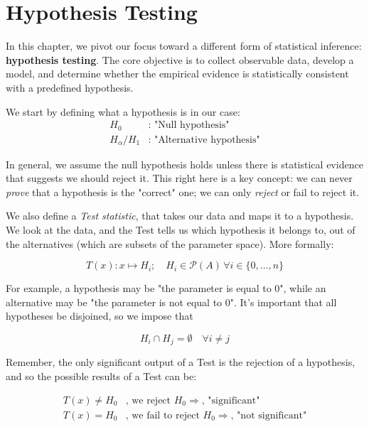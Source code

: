 \chapter{Hypothesis Testing}
In this chapter, we pivot our focus toward a different form of statistical inference: \textbf{hypothesis testing}. The core objective is to collect observable data, develop a model, and determine whether the empirical evidence is statistically consistent with a predefined hypothesis.

We start by defining what a hypothesis is in our case:
	\begin{align*}
	H_0&:\text{ "Null hypothesis"}\\
	H_\alpha/H_1&:\text{ "Alternative hypothesis"}	
	\end{align*}

In general, we assume the null hypothesis holds unless there is statistical evidence that suggests we should reject it. This right here is a key concept: we can never \emph{prove} that a hypothesis is the "correct" one; we can only \emph{reject} or fail to reject it.



We also define a \emph{Test statistic}, that takes our data and maps it to a hypothesis. We look at the data, and the Test tells us which hypothesis it belongs to, out of the alternatives (which are subsets of the parameter space). More formally:

	\[
	T(x) : x\mapsto H_i; \quad H_i\in \mathcal{P}(A)\,\forall i \in \{0,\dots,n\}
	\]

For example, a hypothesis may be "the parameter is equal to $0$", while an alternative may be "the parameter is not equal to $0$". It's important that all hypotheses be disjoined, so we impose that

	\[
	H_i\cap H_j = \emptyset \quad \forall i\neq j
	\]

Remember, the only significant output of a Test is the rejection of a hypothesis, and so the possible results of a Test can be:

\begin{align*}
	T(x) \neq H_0&\text{, we reject }H_0\Rightarrow\text{, "significant"}\\
	T(x) = H_0&\text{, we fail to reject }H_0\Rightarrow\text{, "not significant"}
\end{align*}


